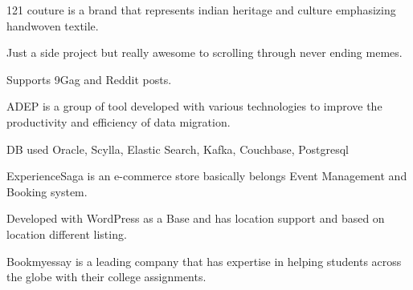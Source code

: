 \documentclass[]{standardcv}
\begin{document}
\begin{minipage}[t]{0.70\textwidth}
\begin{tightemize}
\item 121 couture is a brand that represents indian heritage and culture emphasizing handwoven textile.
\end{tightemize}
\sectionsep

\begin{tightemize}
\item Just a side project but really awesome to scrolling through never ending memes.
\item Supports 9Gag and Reddit posts.
\end{tightemize}
\sectionsep

\begin{tightemize}
\item ADEP is a group of tool developed with various technologies to improve the productivity and efficiency of data migration.
\item DB used Oracle, Scylla, Elastic Search, Kafka, Couchbase,  Postgresql
\end{tightemize}
\sectionsep

\begin{tightemize}
\item ExperienceSaga is an e-commerce store basically belongs Event Management and Booking system.
\item Developed with WordPress as a Base and has location support and based on location different listing.
\end{tightemize}
\sectionsep

\begin{tightemize}
\item Bookmyessay is a leading company that has expertise in helping students across the globe with their college assignments.
\end{tightemize}
\sectionsep



\end{minipage}
\end{document}
